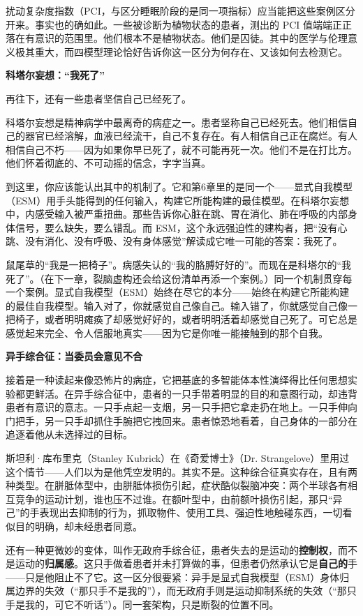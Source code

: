\documentclass[11pt, twoside, openright]{book}
\begin{document}
扰动复杂度指数（PCI，与区分睡眠阶段的是同一项指标）应当能把这些案例区分开来。事实也的确如此。一些被诊断为植物状态的患者，测出的 PCI 值端端正正落在有意识的范围里。他们根本不是植物状态。他们是囚徒。其中的医学与伦理意义极其重大，而四模型理论恰好告诉你这一区分为何存在、又该如何去检测它。

\textbf{科塔尔妄想：“我死了”}

再往下，还有一些患者坚信自己已经死了。

科塔尔妄想是精神病学中最离奇的病症之一。患者坚称自己已经死去。他们相信自己的器官已经溶解，血液已经流干，自己不复存在。有人相信自己正在腐烂。有人相信自己不朽------因为如果你早已死了，就不可能再死一次。他们不是在打比方。他们怀着彻底的、不可动摇的信念，字字当真。

到这里，你应该能认出其中的机制了。它和第6章里的是同一个------显式自我模型（ESM）用手头能得到的任何输入，构建它所能构建的最佳模型。在科塔尔妄想中，内感受输入被严重扭曲。那些告诉你心脏在跳、胃在消化、肺在呼吸的内部身体信号，要么缺失，要么错乱。而 ESM，这个永远强迫性的建构者，把“没有心跳、没有消化、没有呼吸、没有身体感觉”解读成它唯一可能的答案：我死了。

鼠尾草的“我是一把椅子”。病感失认的“我的胳膊好好的”。而现在是科塔尔的“我死了”。（在下一章，裂脑虚构还会给这份清单再添一个案例。）同一个机制贯穿每一个案例。显式自我模型（ESM）始终在尽它的本分------始终在构建它所能构建的最佳自我模型。输入对了，你就感觉自己像自己。输入错了，你就感觉自己像一把椅子，或者明明瘫痪了却感觉好好的，或者明明活着却感觉自己死了。可它总是感觉起来完全、令人信服地真实------因为它是你唯一能接触到的那个自我。

\textbf{异手综合征：当委员会意见不合}

接着是一种读起来像恐怖片的病症，它把基底的多智能体本性演绎得比任何思想实验都更鲜活。在异手综合征中，患者的一只手带着明显的目的和意图行动，却违背患者有意识的意志。一只手点起一支烟，另一只手把它拿走扔在地上。一只手伸向门把手，另一只手却抓住手腕把它拽回来。患者惊恐地看着，自己身体的一部分在追逐着他从未选择过的目标。

斯坦利·库布里克（Stanley Kubrick）在《奇爱博士》（Dr. Strangelove）里用过这个情节------人们以为是他凭空发明的。其实不是。这种综合征真实存在，且有两种类型。在胼胝体型中，由胼胝体损伤引起，症状酷似裂脑冲突：两个半球各有相互竞争的运动计划，谁也压不过谁。在额叶型中，由前额叶损伤引起，那只“异己”的手表现出去抑制的行为，抓取物件、使用工具、强迫性地触碰东西，一切看似目的明确，却未经患者同意。

还有一种更微妙的变体，叫作无政府手综合征，患者失去的是运动的\textbf{控制权}，而不是运动的\textbf{归属感}。这只手做着患者并未打算做的事，但患者仍然承认它是\textbf{自己的}手------只是他阻止不了它。这一区分很要紧：异手是显式自我模型（ESM）身体归属边界的失效（“那只手不是我的”），而无政府手则是运动抑制系统的失效（“那只手是我的，可它不听话”）。同一套架构，只是断裂的位置不同。
\end{document}
